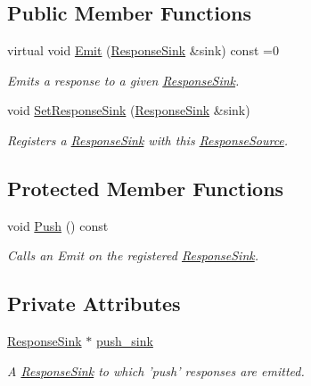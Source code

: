 \subsection*{Public Member Functions}
\begin{DoxyCompactItemize}
\item 
virtual void \hyperlink{classResponseSource_a498ee53cca912cdb6d48043108c39dc1}{Emit} (\hyperlink{classResponseSink}{Response\+Sink} \&sink) const =0
\begin{DoxyCompactList}\small\item\em Emits a response to a given \hyperlink{classResponseSink}{Response\+Sink}. \end{DoxyCompactList}\item 
void \hyperlink{classResponseSource_a12c45136716adffa59d5e5e1ca80b7ce}{Set\+Response\+Sink} (\hyperlink{classResponseSink}{Response\+Sink} \&sink)
\begin{DoxyCompactList}\small\item\em Registers a \hyperlink{classResponseSink}{Response\+Sink} with this \hyperlink{classResponseSource}{Response\+Source}. \end{DoxyCompactList}\end{DoxyCompactItemize}
\subsection*{Protected Member Functions}
\begin{DoxyCompactItemize}
\item 
void \hyperlink{classResponseSource_a6e3b93326ee043f6d60510acd08de69b}{Push} () const 
\begin{DoxyCompactList}\small\item\em Calls an Emit on the registered \hyperlink{classResponseSink}{Response\+Sink}. \end{DoxyCompactList}\end{DoxyCompactItemize}
\subsection*{Private Attributes}
\begin{DoxyCompactItemize}
\item 
\hyperlink{classResponseSink}{Response\+Sink} $\ast$ \hyperlink{classResponseSource_a8a3ce306db2d1a0a9b9c563e5e8c4b31}{push\+\_\+sink}
\begin{DoxyCompactList}\small\item\em A \hyperlink{classResponseSink}{Response\+Sink} to which 'push' responses are emitted. \end{DoxyCompactList}\end{DoxyCompactItemize}


